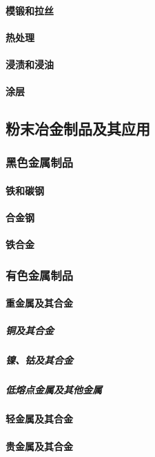 \documentclass[UTF8]{../../ApplicationUniverse}
\begin{document}
            \paragraph{模锻和拉丝}
            \paragraph{热处理}
            \paragraph{浸渍和浸油}
            \paragraph{涂层}
    \subsection{粉末冶金制品及其应用}
        \subsubsection{黑色金属制品}
            \paragraph{铁和碳钢}
            \paragraph{合金钢}
            \paragraph{铁合金}
        \subsubsection{有色金属制品}
            \paragraph{重金属及其合金}
                \subparagraph{铜及其合金}
                \subparagraph{镍、钴及其合金}
                \subparagraph{低熔点金属及其他金属}
            \paragraph{轻金属及其合金}
            \paragraph{贵金属及其合金}
\end{document}
